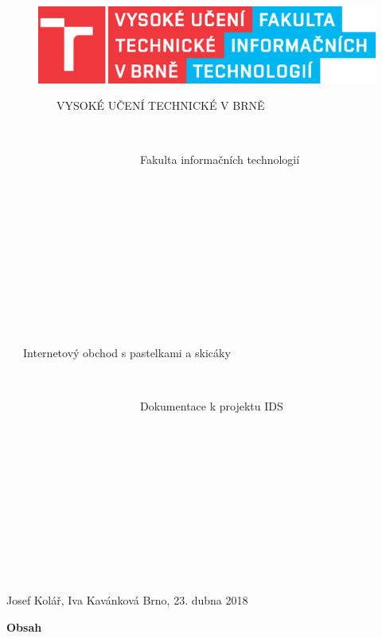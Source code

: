 \documentclass[12pt,a4paper]{article}
\begin{document}
	
	\begin{titlepage}
	\begin{figure}
	\centering
 	\includegraphics[scale=1.0]{obr/logo.eps}
	\end{figure}
	
	\begin{LARGE}
 	\ \ \ \ \ \ \ \ \ VYSOKÉ UČENÍ TECHNICKÉ V BRNĚ
	\end{LARGE}\\
	
	\begin{Large}
	\ \ \ \ \ \ \ \ \ \ \ \ \ \ \ \ \ \ \ \ \ \ \ \ Fakulta informačních technologií
	\end{Large}\\\\\\\\\\\\\\\\\\\

 	\begin{Huge}
 	\ \ \ Internetový obchod s pastelkami a skicáky
	\end{Huge}
	\\
	
	\begin{Large}
	\ \ \ \ \ \ \ \ \ \ \ \ \ \ \ \ \ \ \ \ \ \ \ \ Dokumentace k projektu IDS
	\end{Large}\\\\\\\\\\\\\\\\\\\
	
	\vfill \center Josef Kolář, Iva Kavánková \qquad \qquad \qquad \qquad \qquad \qquad \qquad Brno, 23. dubna 2018

	\end{titlepage}
	
	
	\newpage
	\large
	\noindent \begin{Large} \textbf{{Obsah}} \end{Large}\\
 	
\end{document}
